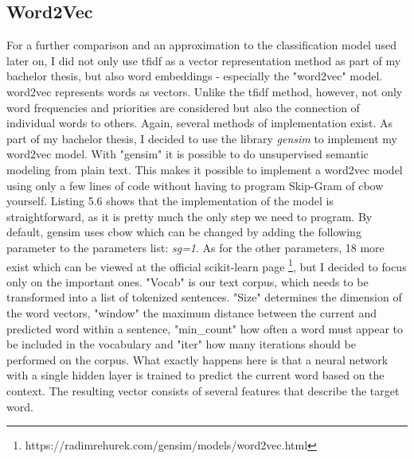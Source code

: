 \documentclass[a4paper, 11pt,titlepage,oneside,openany]{book}
\begin{document}
\subsection{Word2Vec} 
For a further comparison and an approximation to the classification model used later on, I did not only use \gls{tfidf} as a vector representation method as part of my bachelor thesis, but also word embeddings - especially the "word2vec" model. \\
word2vec represents words as vectors. Unlike the  \gls{tfidf} method, however, not only word frequencies and priorities are considered but also the connection of individual words to others. Again, several methods of implementation exist. 
\noindent As part of my bachelor thesis, I decided to use  the library \textit{gensim} \cite{gensim} to implement my word2vec model. With "gensim" it is  possible to do  unsupervised semantic modeling from plain text. This makes it possible to implement a word2vec model using only a few lines of code without having to program Skip-Gram of \gls{cbow} yourself. 
 Listing 5.6 shows that the implementation of the model is straightforward, as it is pretty much the only step we need to program. By default, gensim uses \gls{cbow} which can be  changed  by adding the following parameter to the parameters list: \textit{sg=1}. As for the other parameters, 18 more exist which can be viewed at the official scikit-learn page \footnote{https://radimrehurek.com/gensim/models/word2vec.html}, but I decided to focus only on the important ones. "Vocab" is our text corpus, which needs to be transformed into a list of tokenized sentences. "Size" determines the dimension of the word vectors, "window" the maximum distance between the current and predicted word within a sentence, "min\_count" how often a word must appear to be included in the vocabulary and "iter" how many iterations  should be performed on the corpus. What exactly happens here is that a neural network with a single hidden layer is trained to predict the current word based on the context. The resulting vector consists of several features that describe the target word.
\end{document}
